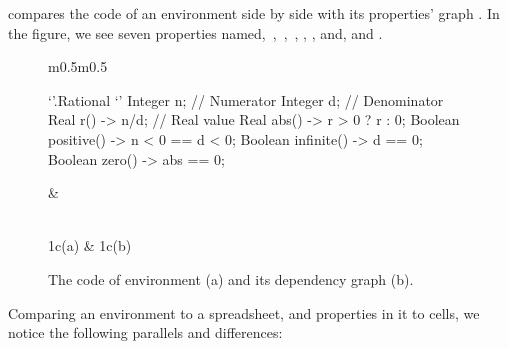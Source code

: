  compares the \Reap code of an environment side by side
with its properties' graph . In the figure, we see seven properties
named,~,~,~, , , and,  and
.

\begin{figure}
  \caption{\label{figure:rational}%
    The \Reap code of environment  (a) and
    its dependency graph (b).
  }
  \begin{tabular}{m{}m{}}
    \begin{minipage}[t]{\columnwidth}
    \begin{reap}
    `'.Rational {`'
    Integer n; // Numerator
    Integer d; // Denominator
    Real r() -> n/d; // Real value
    Real abs() -> r > 0 \relax? r : 0;
    Boolean positive() -> n < 0 == d < 0;
    Boolean infinite() -> d == 0;
    Boolean zero() -> abs == 0;
    }
    \end{reap}
    \end{minipage}
    &
    \begin{minipage}[t]{0.5\columnwidth}
    \begin{adjustbox}{width=\columnwidth}
    
    \end{adjustbox}
    \end{minipage}
      \\ \multicolumn1c{(a)} & \multicolumn1c{(b)}
  \end{tabular}
\end{figure}


Comparing an environment to a spreadsheet, and properties in it to cells, we
notice the following parallels and differences:

